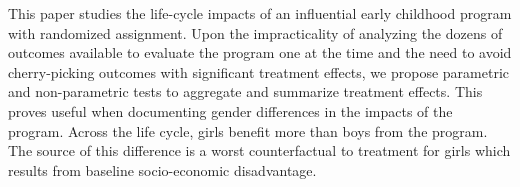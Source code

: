 \noindent This paper studies the life-cycle impacts of an influential early childhood program with randomized assignment. Upon the impracticality of analyzing the dozens of outcomes available to evaluate the program one at the time and the need to avoid cherry-picking outcomes with significant treatment effects, we propose parametric and non-parametric tests to aggregate and summarize treatment effects. This proves useful when documenting gender differences in the impacts of the program. Across the life cycle, girls benefit more than boys from the program. The source of this difference is a worst counterfactual to treatment for girls which results from baseline socio-economic disadvantage.